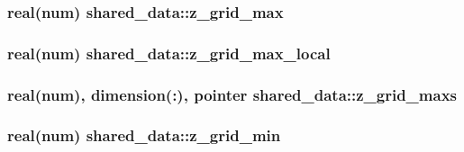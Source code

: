 \subsubsection[{\texorpdfstring{z\+\_\+grid\+\_\+max}{z_grid_max}}]{\setlength{\rightskip}{0pt plus 5cm}real(num) shared\+\_\+data\+::z\+\_\+grid\+\_\+max}\hypertarget{namespaceshared__data_a620f1c71c4db6b0f2b9f0acc6aefa10d}{}\label{namespaceshared__data_a620f1c71c4db6b0f2b9f0acc6aefa10d}
\subsubsection[{\texorpdfstring{z\+\_\+grid\+\_\+max\+\_\+local}{z_grid_max_local}}]{\setlength{\rightskip}{0pt plus 5cm}real(num) shared\+\_\+data\+::z\+\_\+grid\+\_\+max\+\_\+local}\hypertarget{namespaceshared__data_a456c52690b2fd4549464d70435bb3181}{}\label{namespaceshared__data_a456c52690b2fd4549464d70435bb3181}
\subsubsection[{\texorpdfstring{z\+\_\+grid\+\_\+maxs}{z_grid_maxs}}]{\setlength{\rightskip}{0pt plus 5cm}real(num), dimension(\+:), pointer shared\+\_\+data\+::z\+\_\+grid\+\_\+maxs}\hypertarget{namespaceshared__data_a0e3e23f798e7e32d6ae0684ffa41a089}{}\label{namespaceshared__data_a0e3e23f798e7e32d6ae0684ffa41a089}
\subsubsection[{\texorpdfstring{z\+\_\+grid\+\_\+min}{z_grid_min}}]{\setlength{\rightskip}{0pt plus 5cm}real(num) shared\+\_\+data\+::z\+\_\+grid\+\_\+min}\hypertarget{namespaceshared__data_a16d11c0437372fc94fba8f696cc3435d}{}\label{namespaceshared__data_a16d11c0437372fc94fba8f696cc3435d}
